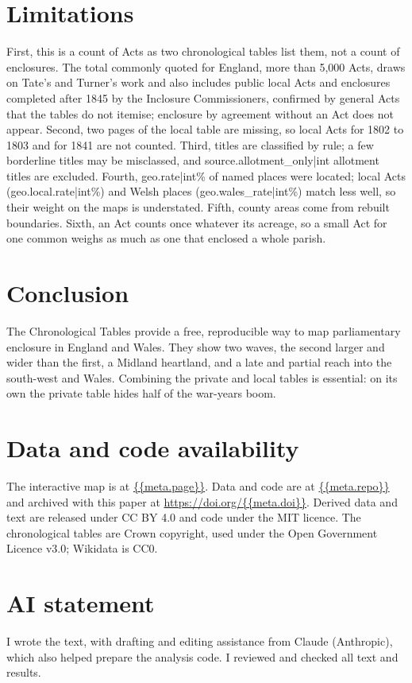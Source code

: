 \documentclass[11pt,a4paper]{article}
\begin{document}
\section{Limitations}
First, this is a count of Acts as two chronological tables list them, not a count of enclosures. The total commonly quoted for England, more than 5,000 Acts, draws on Tate's and Turner's work and also includes public local Acts and enclosures completed after 1845 by the Inclosure Commissioners, confirmed by general Acts that the tables do not itemise; enclosure by agreement without an Act does not appear. Second, two pages of the local table are missing, so local Acts for 1802 to 1803 and for 1841 are not counted. Third, titles are classified by rule; a few borderline titles may be misclassed, and {{source.allotment_only|int}} allotment titles are excluded. Fourth, {{geo.rate|int}}\% of named places were located; local Acts ({{geo.local.rate|int}}\%) and Welsh places ({{geo.wales_rate|int}}\%) match less well, so their weight on the maps is understated. Fifth, county areas come from rebuilt boundaries. Sixth, an Act counts once whatever its acreage, so a small Act for one common weighs as much as one that enclosed a whole parish.

\section{Conclusion}
The Chronological Tables provide a free, reproducible way to map parliamentary enclosure in England and Wales. They show two waves, the second larger and wider than the first, a Midland heartland, and a late and partial reach into the south-west and Wales. Combining the private and local tables is essential: on its own the private table hides half of the war-years boom.

\section*{Data and code availability}
The interactive map is at \url{{{meta.page}}}. Data and code are at \url{{{meta.repo}}} and archived with this paper at \url{https://doi.org/{{meta.doi}}}. Derived data and text are released under CC BY 4.0 and code under the MIT licence. The chronological tables are Crown copyright, used under the Open Government Licence v3.0; Wikidata is CC0.

\section*{AI statement}
I wrote the text, with drafting and editing assistance from Claude (Anthropic), which also helped prepare the analysis code. I reviewed and checked all text and results.
\end{document}
